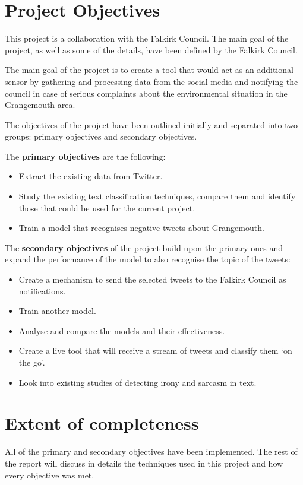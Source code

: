 \section{Project Objectives}
\label{sec:objectives}

This project is a collaboration with the Falkirk Council. The main goal of the project, as well as some of the details, have been defined by the Falkirk Council.

The main goal of the project is to create a tool that would act as an additional sensor by gathering and processing data from the social media and notifying the council in case of serious complaints about the environmental situation in the Grangemouth area. 

The objectives of the project have been outlined initially and separated into two groups: primary objectives and secondary objectives.

The \textbf{primary objectives} are the following:
\begin{itemize}
    \item Extract the existing data from Twitter. 
    \item Study the existing text classification techniques, compare them and identify those that could be used for the current project.
    \item Train a model that recognises negative tweets about Grangemouth.
\end{itemize}

The \textbf{secondary objectives} of the project build upon the primary ones and expand the performance of the model to also recognise the topic of the tweets:
\begin{itemize}
    \item Create a mechanism to send the selected tweets to the Falkirk Council as notifications. 
    \item Train another model.
    \item Analyse and compare the models and their effectiveness.
    \item Create a live tool that will receive a stream of tweets and classify them `on the go'.
    \item Look into existing studies of detecting irony and sarcasm in text.
\end{itemize}

\section{Extent of completeness}
\label{sec:completeness}

All of the primary and secondary objectives have been implemented. The rest of the report will discuss in details the techniques used in this project and how every objective was met. 
